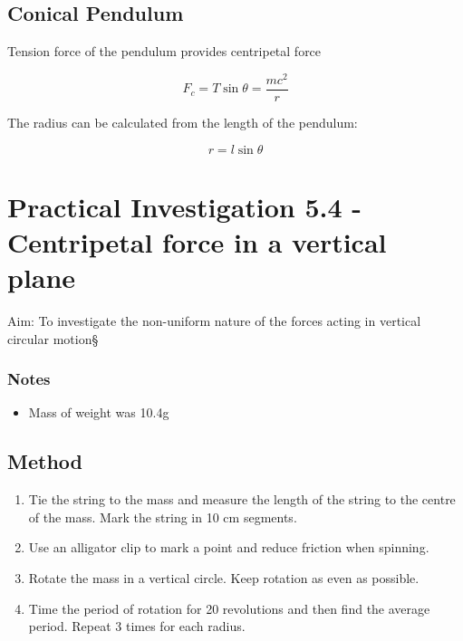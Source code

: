 	\subsection{Conical Pendulum}
		Tension force of the pendulum provides centripetal force

		$$F_c = T\sin{\theta} = \frac{mc^2}{r}$$

		The radius can be calculated from the length of the pendulum:

		$$r=l\sin{\theta}$$
		

\section{Practical Investigation 5.4 - Centripetal force in a vertical plane} \label{13/11/2024}
	
	Aim: To investigate the non-uniform nature of the forces acting in vertical circular motion\S
	
	\subsubsection{Notes}
	\begin{itemize}
		\item Mass of weight was 10.4g
	\end{itemize}

	\subsection{Method}
		\begin{enumerate}
			\item Tie the string to the mass and measure the length of the string to the centre of the mass. Mark the string in 10 cm segments.
			\item Use an alligator clip to mark a point and reduce friction when spinning.
			\item Rotate the mass in a vertical circle. Keep rotation as even as possible.
			\item Time the period of rotation for 20 revolutions and then find the average period. Repeat 3 times for each radius.
		\end{enumerate}

